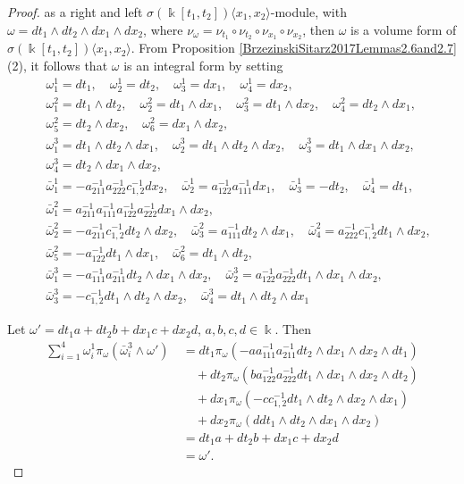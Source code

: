 \documentclass{amsart}
\theoremstyle{definition}
\theoremstyle{remark}
\numberwithin{equation}{section}
\begin{document}
\begin{proof}
as a right and left $\sigma(\Bbbk[t_1, t_2])\langle x_1, x_2\rangle$-module, with $\omega=dt_1\wedge dt_2 \wedge dx_1 \wedge dx_2$, where $\nu_{\omega}=\nu_{t_1}\circ\nu_{t_2}\circ\nu_{x_1}\circ\nu_{x_2}$, then $\omega$ is a volume form of $\sigma(\Bbbk[t_1, t_2])\langle x_1, x_2\rangle$. From Proposition \ref{BrzezinskiSitarz2017Lemmas2.6and2.7} (2), it follows that $\omega$ is an integral form by setting
\begin{align*}
    &\ \omega_1^1= dt_1, \quad \omega_2^1= dt_2, \quad \omega_3^1= dx_1, \quad \omega_4^1= dx_2, \\
    &\ \omega_1^2=dt_1\wedge dt_2, \quad \omega_2^2=dt_1\wedge dx_1, \quad \omega_3^2= dt_1\wedge dx_2, \quad \omega_4^2= dt_2\wedge dx_1, \\
    &\ \omega_5^2= dt_2\wedge dx_2, \quad  \omega_6^2= dx_1\wedge dx_2,   \\
    &\ \omega_1^3=dt_1\wedge dt_2\wedge dx_1, \quad \omega_2^3= dt_1\wedge dt_2 \wedge dx_2, \quad \omega_3^3= dt_1\wedge dx_1 \wedge dx_2, \\
    &\ \omega_4^3= dt_2\wedge dx_1 \wedge dx_2, \\
     &\ \bar{\omega}_1^1=-a_{211}^{-1}a_{222}^{-1}c_{1,2}^{-1}dx_2, \quad \bar{\omega}_2^1=a_{122}^{-1}a_{111}^{-1}dx_1,\quad \bar{\omega}_3^1=-dt_2, \quad \bar{\omega}_4^1=dt_1, \\
    &\ \bar{\omega}_1^2=a_{211}^{-1}a_{111}^{-1}a_{122}^{-1}a_{222}^{-1}dx_1\wedge dx_2, \\
    &\ \bar{\omega}_2^2=-a_{211}^{-1}c_{1,2}^{-1}dt_2\wedge dx_2, \quad \bar{\omega}_3^2 = a_{111}^{-1}dt_2\wedge dx_1, \quad \bar{\omega}_4^2 = a_{222}^{-1}c_{1,2}^{-1}dt_1\wedge dx_2, \\
    &\ \bar{\omega}_5^2 = -a_{122}^{-1}dt_1\wedge dx_1, \quad \bar{\omega}_6^2 = dt_1\wedge dt_2,\\
    &\ \bar{\omega}_1^3=-a_{111}^{-1}a_{211}^{-1}dt_2\wedge dx_1\wedge dx_2, \quad \bar{\omega}_2^3=a_{122}^{-1}a_{222}^{-1}dt_1\wedge dx_1 \wedge dx_2, \\
    &\ \bar{\omega}_3^3=-c_{1,2}^{-1}dt_1\wedge dt_2\wedge dx_2, \quad \bar{\omega}_4^3=dt_1 \wedge dt_2 \wedge dx_1
\end{align*}

Let $\omega' = dt_1a+dt_2b+dx_1c+dx_2d$, $a,b,c,d \in \Bbbk$. Then
\begin{align*}
\sum_{i=1}^{4}\omega_{i}^{1}\pi_{\omega}(\bar{\omega}_i^{3}\wedge \omega') &\ =dt_1\pi_{\omega}(-aa_{111}^{-1}a_{211}^{-1}dt_2\wedge dx_1\wedge dx_2 \wedge dt_1)\\
    &\ \quad + dt_2\pi_{\omega}(ba_{122}^{-1}a_{222}^{-1}dt_1\wedge dx_1 \wedge dx_2\wedge dt_2 ) \\
    &\ \quad + dx_1\pi_{\omega}(-cc_{1,2}^{-1}dt_1\wedge dt_2\wedge dx_2 \wedge dx_1)\\
    &\ \quad + dx_2\pi_{\omega}(ddt_1 \wedge dt_2 \wedge dx_1 \wedge dx_2)\\
    &\ = dt_1a + dt_2b + dx_1c + dx_2d \\
    &\ = \omega'.
\end{align*}


\end{proof}
\end{document}
